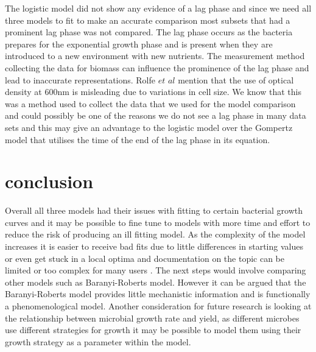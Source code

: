 \documentclass[11pt]{article}
\begin{document}
The logistic model did not show any evidence of a lag phase and since we need all three models to fit to make an accurate comparison most subsets that had a prominent lag phase was not compared. The lag phase occurs as the bacteria prepares for the exponential growth phase and is present when they are introduced to a new environment with new nutrients. The measurement method collecting the data for biomass can influence the prominence of the lag phase and lead to inaccurate representations\cite{Rolfe2012LagAccumulation}. Rolfe $et$ $al$ mention that the use of optical density at 600nm is misleading due to variations in cell size. We know that this was a method used to collect the data that we used for the model comparison and could possibly be one of the reasons we do not see a lag phase in many data sets and this may give an advantage to the logistic model over the Gompertz model that utilises the time of the end of the lag phase in its equation.

\section{conclusion}

Overall all three models had their issues with fitting to certain bacterial growth curves and it may be possible to fine tune to models with more time and effort to reduce the risk of producing an ill fitting model. As the complexity of the model increases it is easier to receive bad fits due to little differences in starting values or even get stuck in a local optima and documentation on the topic can be limited or too complex for many users \cite{Bolker2013StrategiesBUGS}. The next steps would involve comparing other models such as Baranyi-Roberts model\cite{Grijspeerdt1999EstimatingGrowth}. However it can be argued that the Baranyi-Roberts model provides little mechanistic information  and is functionally a phenomenological model\cite{Micha2011MicrobialCannot}. Another consideration for future research is looking at the relationship between microbial growth rate and yield, as different microbes use different strategies for growth it may be possible to model them using their growth strategy as a parameter within the model.

\pagebreak
 



\end{document}
